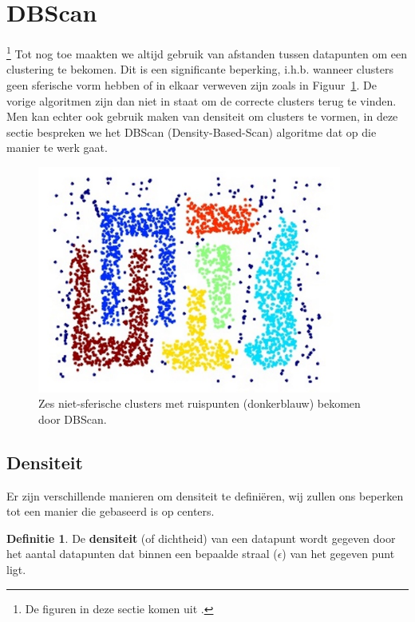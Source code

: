\documentclass[a4paper,12pt]{article}
\theoremstyle{definition}
\newtheorem{definition}{Definitie}[subsection]
\begin{document}
\newpage
\section{DBScan}
\label{sec_dbscan}
\footnote{De figuren in deze sectie komen uit \cite{tan2006introduction}.}
Tot nog toe maakten we altijd gebruik van afstanden tussen datapunten om een
clustering te bekomen. Dit is een significante beperking, i.h.b. wanneer clusters geen
sferische vorm hebben of in elkaar verweven zijn zoals in
Figuur~\ref{fig:dbscan_nonspheric}. De vorige algoritmen zijn dan niet in staat
om de correcte clusters terug te vinden. Men kan echter ook gebruik maken van densiteit om clusters
te vormen, in deze sectie bespreken we het DBScan (Density-Based-Scan) algoritme
dat op die manier te werk gaat.


 \begin{figure}[!ht]\centering
  \includegraphics[width=10cm]{dbscan_nonspheric.jpg}
  \caption{Zes niet-sferische clusters met ruispunten (donkerblauw) bekomen door DBScan.}
  \label{fig:dbscan_nonspheric}
 \end{figure}

\subsection{Densiteit}
Er zijn verschillende manieren om densiteit te definiëren, wij zullen ons beperken
tot een manier die gebaseerd is op centers.
\begin{definition}
De \textbf{densiteit} (of dichtheid) van een datapunt wordt gegeven door het
aantal datapunten dat binnen een bepaalde straal ($\epsilon$) van het gegeven punt ligt.
\end{definition}
\end{document}
